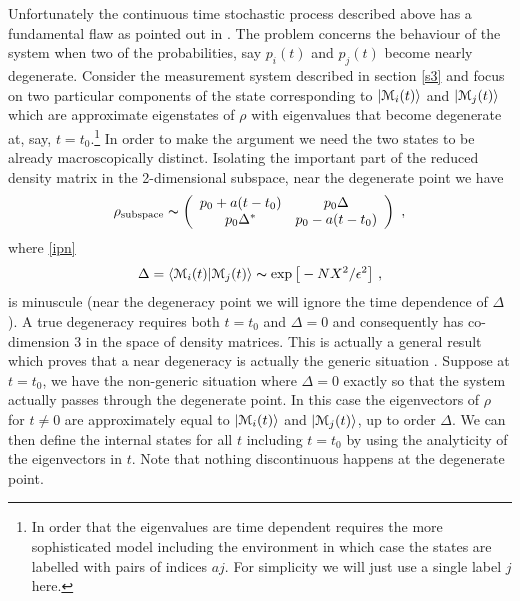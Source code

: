 \documentclass[12pt]{article}
\def\BM{{\EuScript M}}
\def\ket#1{| #1\rangle}
\def\braket#1#2{\VEV{#1 | #2}}
\def\VEV#1{\langle #1\rangle}
\newcommand{\EQ}[1]{\begin{equation}\begin{split} #1
\end{split}\end{equation}}
\begin{document}
Unfortunately the continuous time stochastic process described above has a fundamental flaw as pointed out in \cite{BDV,Donald1}. The problem concerns the behaviour of the system when two of the probabilities, say $p_i(t)$ and $p_j(t)$ become nearly degenerate. Consider the measurement system described in section \ref{s3} and focus on two particular components of the state corresponding to $\ket{\BM_i(t)}$ and $\ket{\BM_j(t)}$ which are approximate eigenstates of $\rho$ with eigenvalues that become degenerate at, say, $t=t_0$.\footnote{In order that the eigenvalues are time dependent requires the more sophisticated model including the environment in which case the states are labelled with pairs of indices $aj$. For simplicity we will just use a single label $j$ here.} In order to make the argument we need the two states to be already macroscopically distinct. Isolating the important part of the reduced density matrix in the 2-dimensional subspace, near the degenerate point we have 
\EQ{
\rho_\text{subspace}\thicksim\left(\begin{array}{cc} p_0+a(t-t_0)& p_0\Delta\\ p_0\Delta^*& p_0-a(t-t_0)\end{array}\right)\ ,
}
where \eqref{ipn}
\EQ{
\Delta=\braket{\BM_i(t)}{\BM_j(t)}\thicksim\exp\big[-NX^2/\epsilon^2\big]\ ,
}
is minuscule (near the degeneracy point we will ignore the time dependence of $\Delta$).
A true degeneracy requires both $t=t_0$ and $\Delta=0$ and consequently has co-dimension 3 in the space of density matrices. This is actually a general result which proves that a near degeneracy is actually the generic situation \cite{BDV,Donald1}. Suppose at $t=t_0$,  we have the non-generic situation where $\Delta=0$ exactly so that the system actually passes through the degenerate point. In this case the eigenvectors of $\rho$ for $t\neq 0$ are approximately equal to $\ket{\BM_i(t)}$ and $\ket{\BM_j(t)}$, up to order $\Delta$. We can then define the internal states for all $t$ including $t=t_0$ by using the analyticity of the eigenvectors in $t$. Note that nothing discontinuous happens at the degenerate point.
\end{document}
